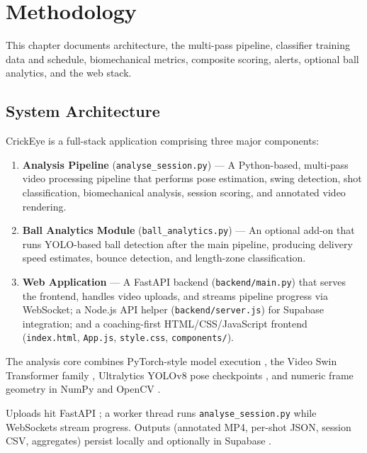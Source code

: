 \chapter{Methodology}
\begin{justify}

This chapter documents architecture, the multi-pass pipeline, classifier training data and schedule, biomechanical metrics, composite scoring, alerts, optional ball analytics, and the web stack.

\section{System Architecture}

\par CrickEye is a full-stack application comprising three major components:

\begin{enumerate}
    \item \textbf{Analysis Pipeline} (\texttt{analyse\_session.py}) — A Python-based, multi-pass video processing pipeline that performs pose estimation, swing detection, shot classification, biomechanical analysis, session scoring, and annotated video rendering.
    \item \textbf{Ball Analytics Module} (\texttt{ball\_analytics.py}) — An optional add-on that runs YOLO-based ball detection after the main pipeline, producing delivery speed estimates, bounce detection, and length-zone classification.
    \item \textbf{Web Application} — A FastAPI backend (\texttt{backend/main.py}) that serves the frontend, handles video uploads, and streams pipeline progress via WebSocket; a Node.js API helper (\texttt{backend/server.js}) for Supabase integration; and a coaching-first HTML/CSS/JavaScript frontend (\texttt{index.html}, \texttt{App.js}, \texttt{style.css}, \texttt{components/}).
\end{enumerate}

\par The analysis core combines PyTorch-style model execution \cite{Paszke2019PyTorch}, the Video Swin Transformer family \cite{Liu2022Swin3D}, Ultralytics YOLOv8 pose checkpoints \cite{YOLOv8}, and numeric frame geometry in NumPy and OpenCV \cite{Harris2020NumPy,OpenCV2024}.

\par Uploads hit FastAPI \cite{FastAPI2024}; a worker thread runs \texttt{analyse\_session.py} while WebSockets \cite{RFC6455} stream progress. Outputs (annotated MP4, per-shot JSON, session CSV, aggregates) persist locally and optionally in Supabase \cite{Supabase2024}.


\end{justify}
